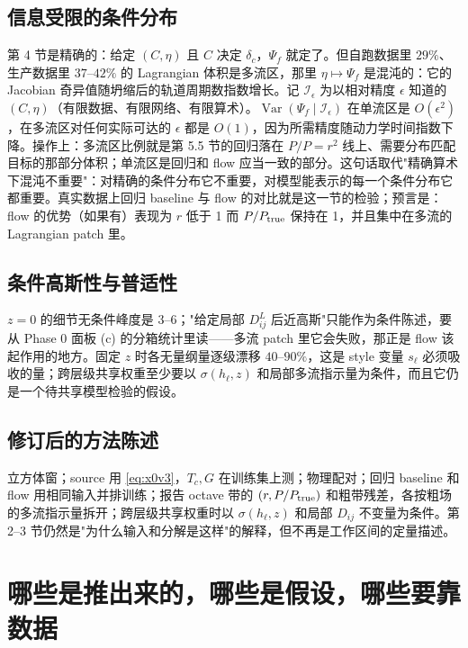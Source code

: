 \documentclass[11pt,UTF8,fontset=none]{ctexart}
\newcommand{\Var}{\operatorname{Var}}
\begin{document}
\subsection{信息受限的条件分布}

第 4 节是精确的：给定 $(C,\eta)$ 且 $C$ 决定 $\delta_c$，$\Psi_f$ 就定了。但自跑数据里 $29\%$、生产数据里 $37$--$42\%$ 的 Lagrangian 体积是多流区，那里 $\eta\mapsto\Psi_f$ 是混沌的：它的 Jacobian 奇异值随坍缩后的轨道周期数指数增长。记 $\mathcal I_\epsilon$ 为以相对精度 $\epsilon$ 知道的 $(C,\eta)$（有限数据、有限网络、有限算术）。$\Var(\Psi_f\mid\mathcal I_\epsilon)$ 在单流区是 $O(\epsilon^2)$，在多流区对任何实际可达的 $\epsilon$ 都是 $O(1)$，因为所需精度随动力学时间指数下降。操作上：多流区比例就是第 5.5 节的回归落在 $P/P=r^2$ 线上、需要分布匹配目标的那部分体积；单流区是回归和 flow 应当一致的部分。这句话取代"精确算术下混沌不重要"：对精确的条件分布它不重要，对模型能表示的每一个条件分布它都重要。真实数据上回归 baseline 与 flow 的对比就是这一节的检验；预言是：flow 的优势（如果有）表现为 $r$ 低于 1 而 $P/P_{\rm true}$ 保持在 1，并且集中在多流的 Lagrangian patch 里。

\subsection{条件高斯性与普适性}

$z=0$ 的细节无条件峰度是 $3$--$6$；"给定局部 $D^L_{ij}$ 后近高斯"只能作为条件陈述，要从 Phase 0 面板 (c) 的分箱统计里读——多流 patch 里它会失败，那正是 flow 该起作用的地方。固定 $z$ 时各无量纲量逐级漂移 $40$--$90\%$，这是 style 变量 $s_\ell$ 必须吸收的量；跨层级共享权重至少要以 $\sigma(h_\ell,z)$ 和局部多流指示量为条件，而且它仍是一个待共享模型检验的假设。

\subsection{修订后的方法陈述}

立方体窗；source 用 \eqref{eq:x0v3}，$T_c,G$ 在训练集上测；物理配对；回归 baseline 和 flow 用相同输入并排训练；报告 octave 带的 $(r,P/P_{\rm true})$ 和粗带残差，各按粗场的多流指示量拆开；跨层级共享权重时以 $\sigma(h_\ell,z)$ 和局部 $D_{ij}$ 不变量为条件。第 2--3 节仍然是"为什么输入和分解是这样"的解释，但不再是工作区间的定量描述。

\section{哪些是推出来的，哪些是假设，哪些要靠数据}
\end{document}
